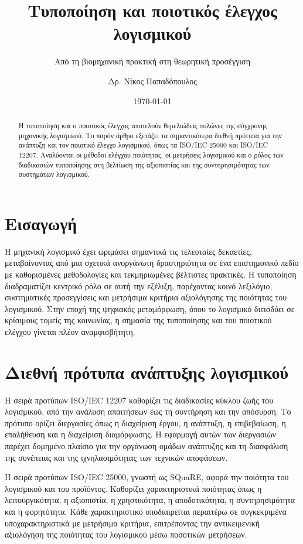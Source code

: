 \documentclass[
    language=greek,
    doctype=article,
]{../../omnilatex}
\title{Τυποποίηση και ποιοτικός έλεγχος λογισμικού}
\subtitle{Από τη βιομηχανική πρακτική στη θεωρητική προσέγγιση}
\author{Δρ. Νίκος Παπαδόπουλος}
\date{\today}
\begin{document}
\maketitle

\begin{abstract}
Η τυποποίηση και ο ποιοτικός έλεγχος αποτελούν θεμελιώδεις πυλώνες της σύγχρονης μηχανικής λογισμικού. Το παρόν άρθρο εξετάζει τα σημαντικότερα διεθνή πρότυπα για την ανάπτυξη και τον ποιοτικό έλεγχο λογισμικού, όπως τα ISO/IEC 25000 και ISO/IEC 12207. Αναλύονται οι μέθοδοι ελέγχου ποιότητας, οι μετρήσεις λογισμικού και ο ρόλος των διαδικασιών τυποποίησης στη βελτίωση της αξιοπιστίας και της συντηρησιμότητας των συστημάτων λογισμικού.
\end{abstract}

\section{Εισαγωγή}
Η μηχανική λογισμικό έχει ωριμάσει σημαντικά τις τελευταίες δεκαετίες, μεταβαίνοντας από μια σχετικά ανοργάνωτη δραστηριότητα σε ένα επιστημονικό πεδίο με καθορισμένες μεθοδολογίες και τεκμηριωμένες βέλτιστες πρακτικές. Η τυποποίηση διαδραματίζει κεντρικό ρόλο σε αυτή την εξέλιξη, παρέχοντας κοινό λεξιλόγιο, συστηματικές προσεγγίσεις και μετρήσιμα κριτήρια αξιολόγησης της ποιότητας του λογισμικού. Στην εποχή της ψηφιακός μεταμόρφωση, όπου το λογισμικό διεισδύει σε κρίσιμους τομείς της κοινωνίας, η σημασία της τυποποίησης και του ποιοτικού ελέγχου γίνεται πλέον αναμφισβήτητη.

\section{Διεθνή πρότυπα ανάπτυξης λογισμικού}
Η σειρά προτύπων ISO/IEC 12207 καθορίζει τις διαδικασίες κύκλου ζωής του λογισμικού, από την ανάλυση απαιτήσεων έως τη συντήρηση και την απόσυρση. Το πρότυπο ορίζει διεργασίες όπως η διαχείριση έργου, η ανάπτυξη, η επιβεβαίωση, η επαλήθευση και η διαχείριση διαμόρφωσης. Η εφαρμογή αυτών των διεργασιών παρέχει δομημένο πλαίσιο για την οργάνωση ομάδων ανάπτυξης και τη διασφάλιση της συνέπειας και της ιχνηλασιμότητας των τεχνικών αποφάσεων.

Η σειρά προτύπων ISO/IEC 25000, γνωστή ως SQuaRE, αφορά την ποιότητα του λογισμικού και του προϊόντος. Καθορίζει χαρακτηριστικά ποιότητας όπως η λειτουργικότητα, η αξιοπιστία, η χρηστικότητα, η αποδοτικότητα, η συντηρησιμότητα και η φορητότητα. Κάθε χαρακτηριστικό υποδιαιρείται περαιτέρω σε συγκεκριμένα υποχαρακτηριστικά με μετρήσιμα κριτήρια, επιτρέποντας την αντικειμενική αξιολόγηση της ποιότητας του λογισμικού μέσω ποσοτικών μετρήσεων.
\end{document}
